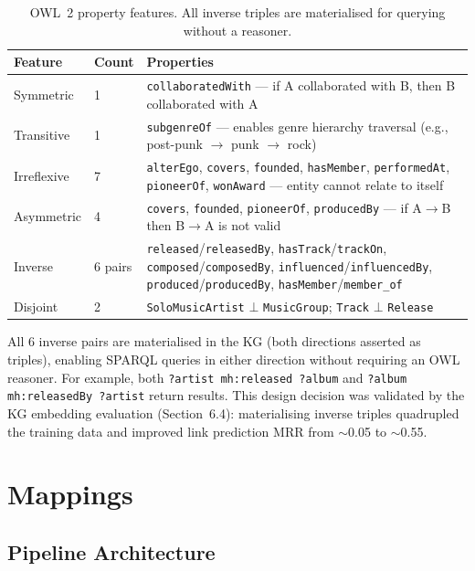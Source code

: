 \documentclass[11pt,a4paper]{article}
\begin{document}
\begin{table}[h]
\centering
\small
\begin{tabular}{llp{7cm}}
\toprule
\textbf{Feature} & \textbf{Count} & \textbf{Properties} \\
\midrule
Symmetric & 1 & \texttt{collaboratedWith} --- if A collaborated with B, then B collaborated with A \\
Transitive & 1 & \texttt{subgenreOf} --- enables genre hierarchy traversal (e.g., post-punk $\rightarrow$ punk $\rightarrow$ rock) \\
Irreflexive & 7 & \texttt{alterEgo}, \texttt{covers}, \texttt{founded}, \texttt{hasMember}, \texttt{performedAt}, \texttt{pioneerOf}, \texttt{wonAward} --- entity cannot relate to itself \\
Asymmetric & 4 & \texttt{covers}, \texttt{founded}, \texttt{pioneerOf}, \texttt{producedBy} --- if A$\rightarrow$B then B$\rightarrow$A is not valid \\
Inverse & 6 pairs & \texttt{released}/\texttt{releasedBy}, \texttt{hasTrack}/\texttt{trackOn}, \texttt{composed}/\texttt{composedBy}, \texttt{influenced}/\texttt{influencedBy}, \texttt{produced}/\texttt{producedBy}, \texttt{hasMember}/\texttt{member\_of} \\
Disjoint & 2 & \texttt{SoloMusicArtist} $\bot$ \texttt{MusicGroup}; \texttt{Track} $\bot$ \texttt{Release} \\
\bottomrule
\end{tabular}
\caption{OWL~2 property features. All inverse triples are materialised for querying without a reasoner.}
\end{table}

All 6 inverse pairs are materialised in the KG (both directions asserted as triples), enabling SPARQL queries in either direction without requiring an OWL reasoner. For example, both \texttt{?artist mh:released ?album} and \texttt{?album mh:releasedBy ?artist} return results. This design decision was validated by the KG embedding evaluation (Section~6.4): materialising inverse triples quadrupled the training data and improved link prediction MRR from $\sim$0.05 to $\sim$0.55.


\section{Mappings}


\subsection{Pipeline Architecture}
\end{document}
